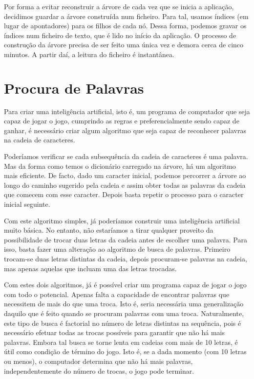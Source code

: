\documentclass[12pt,a4paper,reqno]{report}
\numberwithin{equation}{section}
\begin{document}
Por forma a evitar reconstruir a árvore de cada vez que se inicia a aplicação, decidimos guardar a árvore construída num ficheiro. Para tal, usamos índices (em lugar de apontadores) para os filhos de cada nó. Dessa forma, podemos gravar os índices num ficheiro de texto, que é lido no início da aplicação. O processo de construção da árvore precisa de ser feito uma única vez e demora cerca de cinco minutos. A partir daí, a leitura do ficheiro é instantânea.

\chapter{Procura de Palavras}

Para criar uma inteligência artificial, isto é, um programa de computador que seja capaz de jogar o jogo, cumprindo as regras e preferencialmente sendo capaz de ganhar, é necessário criar algum algoritmo que seja capaz de reconhecer palavras na cadeia de caracteres. 

Poderíamos verificar se cada subsequência da cadeia de caracteres é uma palavra. Mas da forma como temos o dicionário carregado na árvore, há um algoritmo mais eficiente. De facto, dado um caracter inicial, podemos percorrer a árvore ao longo do caminho sugerido pela cadeia e assim obter todas as palavras da cadeia que comecem com esse caracter. Depois basta repetir o processo para o caracter inicial seguinte.

Com este algoritmo simples, já poderíamos construir uma inteligência artificial muito básica. No entanto, não estaríamos a tirar qualquer proveito da possibilidade de trocar duas letras da cadeia antes de escolher uma palavra. Para isso, basta fazer uma alteração ao algoritmo de busca de palavras. Primeiro trocam-se duas letras distintas da cadeia, depois procuram-se palavras na cadeia, mas apenas aquelas que incluam uma das letras trocadas.

Com estes dois algoritmos, já é possível criar um programa capaz de jogar o jogo com todo o potencial. Apenas falta a capacidade de encontrar palavras que necessitem de mais do que uma troca. Isto é, seria necessária uma generalização daquilo que é feito quando se procuram palavras com uma troca. Naturalmente, este tipo de busca é factorial no número de letras distintas na sequência, pois é necessário efetuar todas as trocas possíveis para garantir que não há mais palavras. Embora tal busca se torne lenta em cadeias com mais de 10 letras, é útil como condição de término do jogo. Isto é, se a dada momento (com 10 letras ou menos), o computador determina que não há mais palavras, independentemente do número de trocas, o jogo pode terminar.
\end{document}
